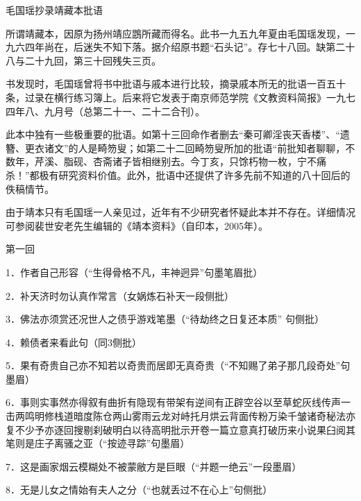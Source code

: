 \newpage

\begin{center}
	{\Huge \heiti 毛国瑶抄录靖藏本批语}
\end{center}






所谓靖藏本，因原为扬州靖应鵾所藏而得名。此书一九五九年夏由毛国瑶发现，一九六四年尚在，后迷失不知下落。据介绍原书题``石头记''。存七十八回。缺第二十八与二十九回，第三十回残失三页。

书发现时，毛国瑶曾将书中批语与戚本进行比较，摘录戚本所无的批语一百五十条，过录在横行练习簿上。后来将它发表于南京师范学院《文教资料简报》一九七四年八、九月号（总第二十一、二十二合刊）。

此本中独有一些极重要的批语。如第十三回命作者删去``秦可卿淫丧天香楼''、``遗簪、更衣诸文''的人是畸笏叟；如第二十二回畸笏叟所加的批语``前批知者聊聊，不数年，芹溪、脂砚、杏斋诸子皆相继别去。今丁亥，只馀朽物一枚，宁不痛杀！''都极有研究资料价值。此外，批语中还提供了许多先前不知道的八十回后的佚稿情节。

由于靖本只有毛国瑶一人亲见过，近年有不少研究者怀疑此本并不存在。详细情况可参阅裴世安老先生编辑的《靖本资料》（自印本，2005年）。

第一回

1．作者自己形容{（\kaishu ``生得骨格不凡，丰神迥异''句墨笔眉批）}

2．补天济时勿认真作常言{（\kaishu 女娲炼石补天一段侧批）}

3．佛法亦须赏还况世人之债乎游戏笔墨{（\kaishu ``待劫终之日复还本质''
句侧批）}

4．赖债者来看此句{（\kaishu 同3侧批）}

5．果有奇贵自己亦不知若以奇贵而居即无真奇贵{（\kaishu ``不知赐了弟子那几段奇处''句墨眉）}

6．事则实事然亦得叙有曲折有隐现有带架有逆间有正辟空谷以至草蛇灰线传声一击两鸣明修栈道暗度陈仓两山雾雨云龙对峙托月烘云背面传粉万染千皱诸奇秘法亦复不少予亦逐回搜剔刹破明白以待高明批示开卷一篇立意真打破历来小说果臼阅其笔则是庄子离骚之亚{（\kaishu ``按迹寻踪''句墨眉）}

7．这是画家烟云模糊处不被蒙敝方是巨眼{（\kaishu ``并题一绝云''一段墨眉）}

8．无是儿女之情始有夫人之分{（\kaishu ``也就丢过不在心上''句侧批）}

